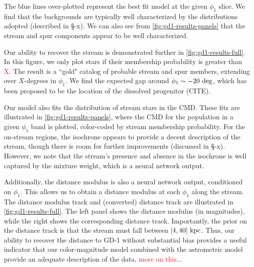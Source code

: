 \documentclass[twocolumn]{aastex631}
\newcommand{\stream}[1]{#1}
\newcommand{\TODO}[1]{{\textcolor{red}{#1}}}
\newcommand{\JN}[1]{\TODO{#1}}
\begin{document}
        The blue lines over-plotted represent the best fit model at the given
        $\phi_1$ slice. We find that the backgrounds are typically well
        characterized by the distributions adopted (described in \S-x). We can
        also see from \autoref{fig:gd1-results-panels} that the stream and spur
        components appear to be well characterized. 
        
        Our ability to recover the stream is demonstrated further in
        \autoref{fig:gd1-results-full}. In this figure, we only plot stars if
        their membership probability is greater than \JN{X}. The result is a
        ``gold" catalog of probable stream and spur members, extending over
        $X$-degrees in $\phi_1$. We find the expected gap around $\phi_1 \sim
        -20~\rm{deg}$, which has been proposed to be the location of the
        dissolved progenitor (CITE).

        Our model also fits the distribution of stream stars in the CMD. These
        fits are illustrated in \autoref{fig:gd1-results-panels}, where the CMD
        for the population in a given $\phi_1$ band is plotted, color-coded by
        stream membership probability. For the on-stream regions, the isochrone
        appears to provide a decent description of the stream, though there is
        room for further improvements (discussed in \S-x). However, we note that
        the stream's presence and absence in the isochrone is well captured by
        the mixture weight, which is a neural network output. 
        
        Additionally, the distance modulus is also a neural network output,
        conditioned on $\phi_1$. This allows us to obtain a distance modulus at
        each $\phi_1$ along the stream. The distance modulus track and
        (converted) distance track are illustrated in
        \autoref{fig:gd1-results-full}. The left panel shows the distance
        modulus (in magnitudes), while the right shows the corresponding
        distance track. Importantly, the prior on the distance track is that the
        stream must fall between $[4,40]~\rm{kpc}$. Thus, our ability to recover
        the distance to \stream{GD-1} without substantial bias provides a useful
        indicator that our color-magnitude model combined with the astrometric
        model provide an adequate description of the data. \JN{more on this...}
\end{document}
